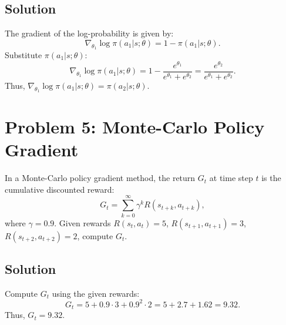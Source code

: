 \documentclass[10pt, oneside]{article}
\theoremstyle{definition}
\begin{document}
\subsection*{Solution}
The gradient of the log-probability is given by:
\[
\nabla_{\theta_1} \log \pi(a_1 | s; \theta) = 1 - \pi(a_1 | s; \theta).
\]
Substitute \( \pi(a_1 | s; \theta) \):
\[
\nabla_{\theta_1} \log \pi(a_1 | s; \theta) = 1 - \frac{e^{\theta_1}}{e^{\theta_1} + e^{\theta_2}} = \frac{e^{\theta_2}}{e^{\theta_1} + e^{\theta_2}}.
\]
Thus, \( \nabla_{\theta_1} \log \pi(a_1 | s; \theta) = \pi(a_2 | s; \theta) \).

\section*{Problem 5: Monte-Carlo Policy Gradient}
In a Monte-Carlo policy gradient method, the return \( G_t \) at time step \( t \) is the cumulative discounted reward:
\[
G_t = \sum_{k=0}^{\infty} \gamma^k R(s_{t+k}, a_{t+k}),
\]
where \( \gamma = 0.9 \). Given rewards \( R(s_t, a_t) = 5 \), \( R(s_{t+1}, a_{t+1}) = 3 \), \( R(s_{t+2}, a_{t+2}) = 2 \), compute \( G_t \).

\subsection*{Solution}
Compute \( G_t \) using the given rewards:
\[
G_t = 5 + 0.9 \cdot 3 + 0.9^2 \cdot 2 = 5 + 2.7 + 1.62 = 9.32.
\]
Thus, \( G_t = 9.32 \).
\end{document}
